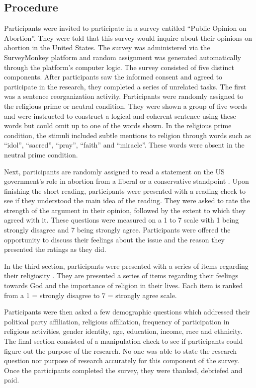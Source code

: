 \documentclass[letterpaper,man,natbib,noextraspace,12pt]{apa6}  %
\begin{document}
\subsection{Procedure}

Participants were invited to participate in a survey entitled “Public Opinion on Abortion”. They were told that this survey would inquire about their opinions on abortion in the United States. The survey was administered via the SurveyMonkey platform and random assignment was generated automatically through the platform’s computer logic. 
The survey consisted of five distinct components. After participants saw the informed consent and agreed to participate in the research, they completed a series of unrelated tasks. The first was a sentence reorganization activity. \citep{bakhti_religious_2018} Participants were randomly assigned to the religious prime or neutral condition. They were shown a group of five words and were instructed to construct a logical and coherent sentence using these words but could omit up to one of the words shown. In the religious prime condition, the stimuli included subtle mentions to religion through words such as “idol”, “sacred”, “pray”, “faith” and “miracle”. These words were absent in the neutral prime condition. 

Next, participants are randomly assigned to read a statement on the US government’s role in abortion from a liberal or a conservative standpoint \citep{suhay_role_2018}. Upon finishing the short reading, participants were presented with a reading check to see if they understood the main idea of the reading. They were asked to rate the strength of the argument in their opinion, followed by the extent to which they agreed with it. These questions were measured on a 1 to 7 scale with 1 being strongly disagree and 7 being strongly agree. Participants were offered the opportunity to discuss their feelings about the issue and the reason they presented the ratings as they did. 

In the third section, participants were presented with a series of items regarding their religiosity \citep{bakhti_religious_2018}. They are presented a series of items regarding their feelings towards God and the importance of religion in their lives. Each item is ranked from a 1 = strongly disagree to 7 = strongly agree scale. 

Participants were then asked a few demographic questions which addressed their political party affiliation, religious affiliation, frequency of participation in religious activities, gender identity, age, education, income, race and ethnicity. The final section consisted of a manipulation check to see if participants could figure out the purpose of the research. No one was able to state the research question nor purpose of research accurately for this component of the survey. Once the participants completed the survey, they were thanked, debriefed and paid. 
\end{document}
